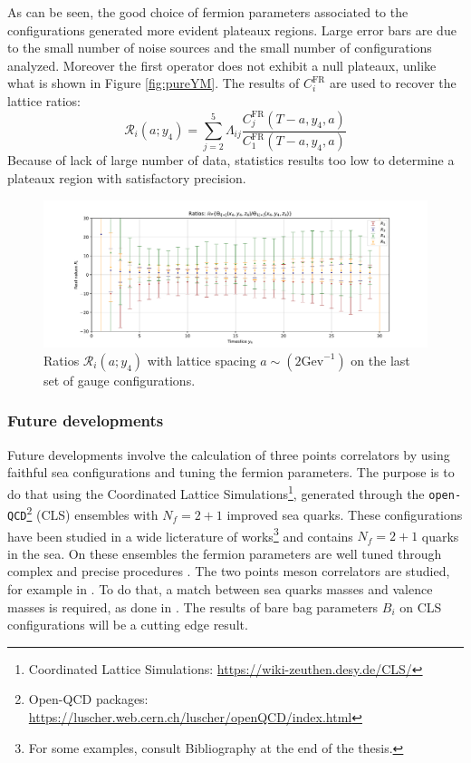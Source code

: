 \documentclass[english, LaM, oneside, noexaminfo]{sapthesis}
\begin{document}
\newline
As can be seen, the good choice of fermion parameters associated to the configurations generated more evident plateaux regions.
Large error bars are due to the small number of noise sources and the small number of configurations analyzed.
Moreover the first operator does not exhibit a null plateaux, unlike what is shown in Figure \ref{fig:pureYM}.
\newline
The results of $C_i^\text{FR}$ are used to recover the lattice ratios:
\begin{equation*}
    \mathcal{R}_i (a;y_4) = \sum_{j=2}^5 \Lambda_{ij} \frac{C_j^\text{FR}(T-a,y_4,a)}{C_1^\text{FR}(T-a,y_4,a)}
\end{equation*}
Because of lack of large number of data, statistics results too low to determine a plateaux region with satisfactory precision.
\begin{figure}[!h]
    \centering
    \includegraphics[width=\textwidth]{imgs-MSc-thesis/ratios.pdf}
    \caption{Ratios $\mathcal{R}_i (a;y_4)$ with lattice spacing $a\sim (2 \text{Gev}^{-1})$ on the last set of gauge configurations.}
    \label{fig:ratios}
\end{figure}

\subsubsection*{Future developments}
\noindent
Future developments involve the calculation of three points correlators by using faithful sea configurations and tuning the fermion parameters.
The purpose is to do that using the Coordinated Lattice Simulations\footnote{Coordinated Lattice Simulations: \href{https://wiki-zeuthen.desy.de/CLS/}{https://wiki-zeuthen.desy.de/CLS/}}, generated through the \texttt{open-QCD}\footnote{Open-QCD packages: \href{https://luscher.web.cern.ch/luscher/openQCD/index.html}{https://luscher.web.cern.ch/luscher/openQCD/index.html}} (CLS) ensembles \cite{Bruno} with $N_f = 2+1$ improved sea quarks.
These configurations have been studied in a wide licterature of works\footnote{For some examples, consult Bibliography at the end of the thesis.} and contains $N_f = 2+1$ quarks in the sea.
On these ensembles the fermion parameters are well tuned through complex and precise procedures \cite{Bruno} \cite{obc-opt3}.
The two points meson correlators are studied, for example in \cite{LightMesons}.
To do that, a match between sea quarks masses and valence masses is required, as done in \cite{matching-masses}.
The results of bare bag parameters $B_i$ on CLS configurations will be a cutting edge result.
\end{document}
